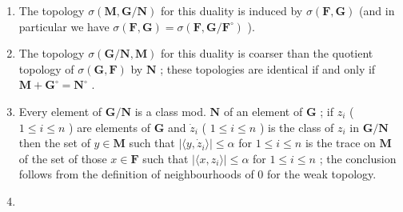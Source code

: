 \begin{enumerate}
\def\labelenumi{(\roman{enumi})}
\item
  The topology \(\sigma(\mathbf{M},\mathbf{G} / \mathbf{N})\) for this duality is induced by \(\sigma(\mathbf{F},\mathbf{G})\) (and in particular we have \(\sigma(\mathbf{F},\mathbf{G}) = \sigma(\mathbf{F},\mathbf{G} / \mathbf{F}^{\circ})\) ).
\item
  The topology \(\sigma(\mathbf{G}/\mathbf{N}, \mathbf{M})\) for this duality is coarser than the quotient topology of \(\sigma(\mathbf{G}, \mathbf{F})\) by \(\mathbf{N}\) ; these topologies are identical if and only if \(\mathbf{M} + \mathbf{G}^{\circ} = \mathbf{N}^{\circ}\) .
\setcounter{enumi}{0}
\item
  Every element of \(\mathbf{G} / \mathbf{N}\) is a class mod. \(\mathbf{N}\) of an element of \(\mathbf{G}\) ; if \(z_{i}\) ( \(1 \leqslant i \leqslant n\) ) are elements of \(\mathbf{G}\) and \(\dot{z}_{i}\) ( \(1 \leqslant i \leqslant n\) ) is the class of \(z_{i}\) in \(\mathbf{G} / \mathbf{N}\) then the set of \(y \in \mathbf{M}\) such that \(|\langle y, \dot{z}_{i} \rangle| \leqslant \alpha\) for \(1 \leqslant i \leqslant n\) is the trace on \(\mathbf{M}\) of the set of those \(x \in \mathbf{F}\) such that \(|\langle x, z_{i} \rangle| \leqslant \alpha\) for \(1 \leqslant i \leqslant n\) ; the conclusion follows from the definition of neighbourhoods of 0 for the weak topology.
\item

\end{enumerate}
